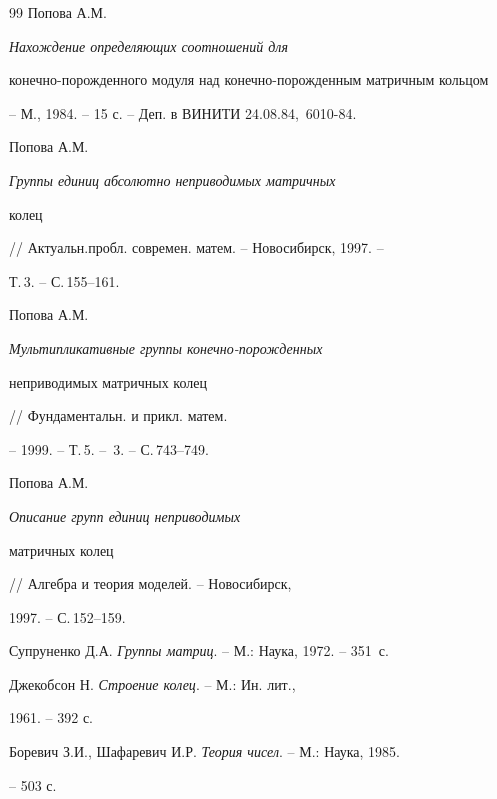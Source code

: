 \begin{thebibliography}{99}
Попова А.М. {\em Нахождение определяющих соотношений для


конечно-порожденного модуля над конечно-порожденным матричным кольцом}


-- М., 1984. -- 15 с. -- Деп. в ВИНИТИ 24.08.84, \No\,6010-84.







Попова А.М. {\em Группы единиц абсолютно неприводимых матричных


колец} // Актуальн.\linebreak пробл. современ. матем. -- Новосибирск, 1997. --


Т.\,3. -- С.\,155--161.







Попова А.М. {\em Мультипликативные группы конечно-порожденных


неприводимых матричных колец} // Фундаментальн. и прикл. матем.


-- 1999. -- Т.\,5. -- \No\,3. -- С.\,743--749.







Попова А.М. {\em Описание групп единиц неприводимых


матричных колец} // Алгебра и теория моделей. -- Новосибирск,


1997. -- С.\,152--159.


 




Супруненко Д.А. {\em Группы матриц}. -- М.: Наука, 1972. -- 351~с.







Джекобсон Н. {\em Строение колец}. -- М.: Ин. лит., 


1961. -- 392 с.







Боревич З.И., Шафаревич И.Р. {\em Теория чисел}. -- М.: Наука, 1985.


-- 503 с.








\end{thebibliography}

